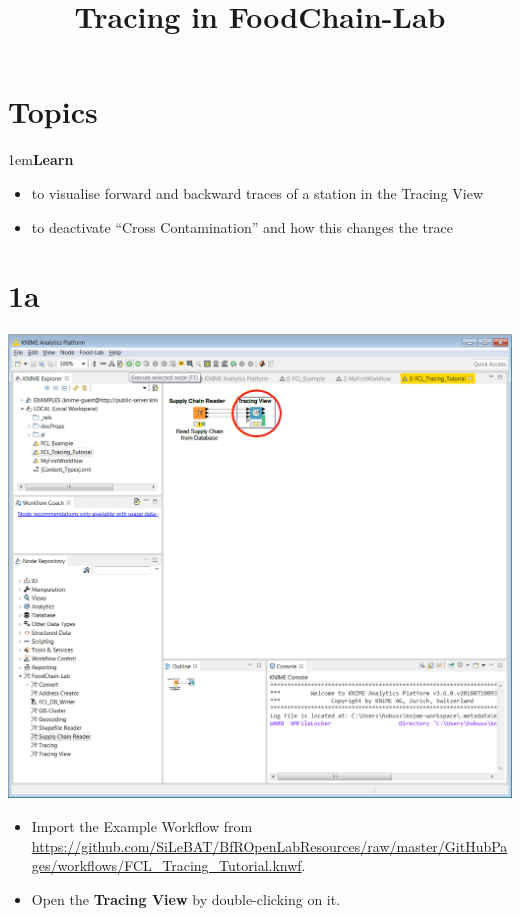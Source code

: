 \documentclass[10pt]{beamer}
\title{Tracing in FoodChain-Lab}
\date{}
\begin{document}
\maketitle

\section{Topics}
\begin{frame}
\leftskip1em\textbf{Learn}
	\begin{itemize}
		\item to visualise forward and backward traces of a station in the Tracing View
		\item to deactivate “Cross Contamination” and how this changes the trace
	\end{itemize}
\end{frame}

\section{1a}
\begin{frame}
	\begin{center}
  		\includegraphics[height=0.6\textheight]{1a.png}
	\end{center}
	\begin{itemize}
		\item Import the Example Workflow from \url{https://github.com/SiLeBAT/BfROpenLabResources/raw/master/GitHubPages/workflows/FCL_Tracing_Tutorial.knwf}.
		\item Open the \textbf{Tracing View} by double-clicking on it.
	\end{itemize}
\end{frame}
\end{document}

